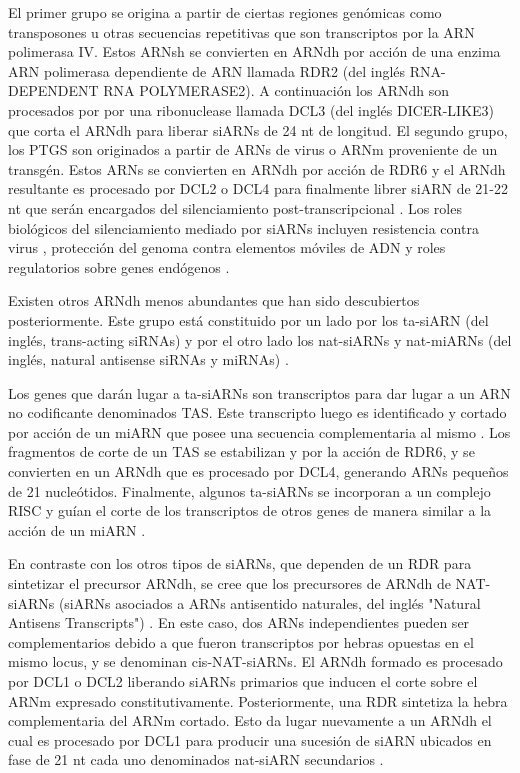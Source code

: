 El primer grupo se origina a partir de ciertas regiones genómicas como transposones u otras secuencias repetitivas que son transcriptos por la ARN polimerasa IV.
Estos ARNsh se convierten en ARNdh por acción de una enzima ARN polimerasa dependiente de ARN llamada RDR2 (del inglés RNA-DEPENDENT RNA POLYMERASE2). 
A continuación los ARNdh son procesados por por una ribonuclease llamada DCL3 (del inglés DICER-LIKE3) que corta el ARNdh para liberar siARNs de 24 nt de longitud.
El segundo grupo, los PTGS son originados a partir de ARNs de virus o ARNm proveniente de un transgén. 
Estos ARNs se convierten en ARNdh por acción de RDR6 y el ARNdh resultante es procesado por DCL2 o DCL4 para finalmente librer siARN de 21-22 nt que serán encargados del silenciamiento post-transcripcional \citep{pmid18358247}.
Los roles biológicos del silenciamiento mediado por siARNs incluyen resistencia contra virus \citep{pmid11485817}, protección del genoma contra elementos móviles de ADN y roles regulatorios sobre genes endógenos \citep{pmid15372043, pmid17943195, Voinnet2009669}.

Existen otros ARNdh menos abundantes que han sido descubiertos posteriormente.
Este grupo está constituido por un lado por los ta-siARN (del inglés, trans-acting siRNAs) y por el otro lado los nat-siARNs y nat-miARNs (del inglés, natural antisense siRNAs y miRNAs) \citep{pmid17943195, pmid18501663, pmid16600909,Voinnet2009669}.

Los genes que darán lugar a ta-siARNs son transcriptos para dar lugar a un ARN no codificante denominados TAS.
Este transcripto luego es identificado y cortado por acción de un miARN que posee una secuencia complementaria al mismo \citep{Allen2005207}.
Los fragmentos de corte de un TAS se estabilizan y por la acción de RDR6, y se convierten en un ARNdh que es procesado por DCL4, generando ARNs pequeños de 21 nucleótidos.
Finalmente, algunos ta-siARNs se incorporan a un complejo RISC y guían el corte de los transcriptos de otros genes de manera similar a la acción de un miARN \citep{Allen2005207,pmid16040244,pmid16131612,Xie2005a}.

En contraste con los otros tipos de siARNs, que dependen de un RDR para sintetizar el precursor ARNdh, se cree que los precursores de ARNdh de NAT-siARNs (siARNs asociados a ARNs antisentido naturales, del inglés "Natural Antisens Transcripts") \citep{pmid16377568,pmid17071740}.
En este caso, dos ARNs independientes pueden ser complementarios debido a que fueron transcriptos por hebras opuestas en el mismo locus, y se denominan cis-NAT-siARNs. 
El ARNdh formado es procesado por DCL1 o DCL2 liberando siARNs primarios que inducen el corte sobre el ARNm expresado constitutivamente.
Posteriormente, una RDR sintetiza la hebra complementaria del ARNm cortado. 
Esto da lugar nuevamente a un ARNdh el cual es procesado por DCL1 para producir una sucesión de siARN ubicados en fase de 21 nt cada uno denominados nat-siARN secundarios \citep{pmid16377568,pmid17071740}.

